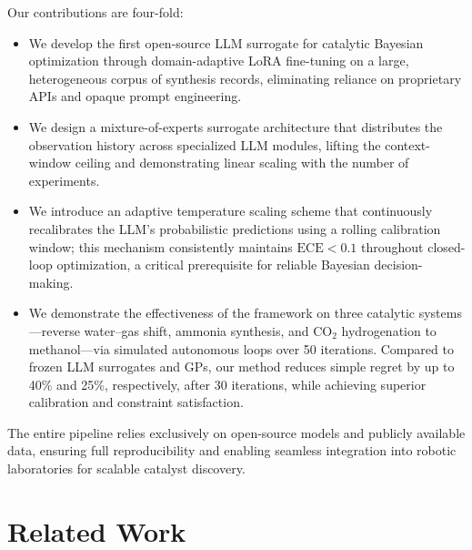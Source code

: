 \documentclass{article}
\begin{document}
Our contributions are four-fold:
\begin{itemize}
    \item We develop the first open-source LLM surrogate for catalytic Bayesian optimization through domain-adaptive LoRA fine-tuning on a large, heterogeneous corpus of synthesis records, eliminating reliance on proprietary APIs and opaque prompt engineering.
    \item We design a mixture-of-experts surrogate architecture that distributes the observation history across specialized LLM modules, lifting the context-window ceiling and demonstrating linear scaling with the number of experiments.
    \item We introduce an adaptive temperature scaling scheme that continuously recalibrates the LLM’s probabilistic predictions using a rolling calibration window; this mechanism consistently maintains $\mathrm{ECE} < 0.1$ throughout closed-loop optimization, a critical prerequisite for reliable Bayesian decision-making.
    \item We demonstrate the effectiveness of the framework on three catalytic systems—reverse water–gas shift, ammonia synthesis, and CO${}_2$ hydrogenation to methanol—via simulated autonomous loops over 50 iterations. Compared to frozen LLM surrogates and GPs, our method reduces simple regret by up to 40\% and 25\%, respectively, after 30 iterations, while achieving superior calibration and constraint satisfaction.
\end{itemize}
The entire pipeline relies exclusively on open-source models and publicly available data, ensuring full reproducibility and enabling seamless integration into robotic laboratories for scalable catalyst discovery.

\section{Related Work}
\end{document}
